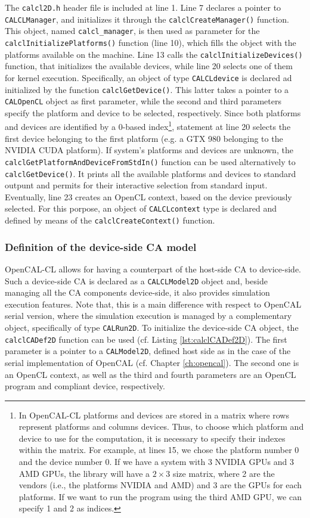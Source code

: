 The \verb'calcl2D.h' header file is included at line 1. Line 7
declares a pointer to \verb'CALCLManager', and initializes it through
the \verb'calclCreateManager()' function. This object, named
\verb'calcl_manager', is then used as parameter for the
\verb'calclInitializePlatforms()' function (line 10), which fills the
object with the platforms available on the machine. Line 13 calls the
\verb'calclInitializeDevices()' function, that initializes the
available devices, while line 20 selects one of them for kernel
execution. Specifically, an object of type \verb'CALCLdevice' is
declared ad initialized by the function \verb'calclGetDevice()'. This
latter takes a pointer to a \verb'CALOpenCL' object as first
parameter, while the second and third parameters specify the platform
and device to be selected, respectively. Since both platforms and
devices are identified by a 0-based index\footnote{In OpenCAL-CL
  platforms and devices are stored in a matrix where rows represent
  platforms and columns devices. Thus, to choose which platform and
  device to use for the computation, it is necessary to specify their
  indexes within the matrix. For example, at lines 15, we chose the
  platform number 0 and the device number 0. If we have a system with
  3 NVIDIA GPUs and 3 AMD GPUs, the library will have a $2 \times 3$
  size matrix, where 2 are the vendors (i.e., the platforms NVIDIA and
  AMD) and 3 are the GPUs for each platforms. If we want to run the
  program using the third AMD GPU, we can specify 1 and 2 as
  indices.}, statement at line 20 selects the first device belonging
to the first platform (e.g. a GTX 980 belonging to the NVIDIA CUDA
platform). If system's platforms and devices are unknown, the
\verb'calclGetPlatformAndDeviceFromStdIn()' function can be used
alternatively to \verb'calclGetDevice()'. It prints all the available
platforms and devices to standard outpunt and permits for their
interactive selection from standard input. Eventually, line 23 creates
an OpenCL context, based on the device previously selected. For this
porpose, an object of \verb'CALCLcontext' type is declared and defined
by means of the \verb'calclCreateContext()' function.


\subsubsection{Definition of the device-side CA model}

OpenCAL-CL allows for having a counterpart of the host-side CA to
device-side. Such a device-side CA is declared as a
\verb'CALCLModel2D' object and, beside managing all the CA components
device-side, it also provides simulation execution features. Note
that, this is a main difference with respect to OpenCAL serial
version, where the simulation execution is managed by a complementary
object, specifically of type \verb'CALRun2D'. To initialize the
device-side CA object, the \verb'calclCADef2D' function can be used
(cf. Listing \ref{lst:calclCADef2D}). The first parameter is a pointer
to a \verb'CALModel2D', defined host side as in the case of the serial
implementation of OpenCAL (cf. Chapter \ref{ch:opencal}). The second
one is an OpenCL context, as well as the third and fourth parameters
are an OpenCL program and compliant device, respectively.

